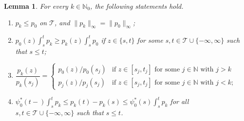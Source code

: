 \documentclass[a4paper]{article}
\newcommand{\N}{\mathbb{N}}
\newcommand{\norm}[1]{\|{#1}\|}
\newtheorem{lemma}[theorem]{Lemma}
\theoremstyle{definition}
\begin{document}
\begin{lemma}
\label{lem:pk-induction}
For every $k \in \N_0$, the following statements hold.
\begin{enumerate}[label=(\alph*)]
\item $p_k \leq p_0$ on $\mathcal{T}$, and $\norm{p_k}_\infty = \norm{p_0}_\infty$;
\item $\displaystyle p_0(z) \int_s^t p_k \geq p_k(z) \int_s^t p_0$ if $z \in \{s,t\}$ for some $s,t \in \mathcal{T} \cup \{-\infty,\infty\}$ such that $s \leq t$;
\item $\dfrac{p_k(z)}{p_k(s_j)} = 
\begin{cases}
p_0(z)/p_0(s_j) &\text{if }z \in [s_j,t_j]\text{ for some }j \in \N\text{ with }j > k \\
p_j(z)/p_j(s_j) &\text{if }z \in [s_j,t_j]\text{ for some }j \in \N\text{ with }j < k;
\end{cases}$
\item $\displaystyle \psi_0^*(t-) \int_s^t p_k \leq p_k(t) - p_k(s) \leq \psi_0^*(s)\int_s^t p_k$ for all $s,t \in \mathcal{T} \cup \{-\infty,\infty\}$ such that $s \leq t$.
\end{enumerate}
\end{lemma}
\end{document}
